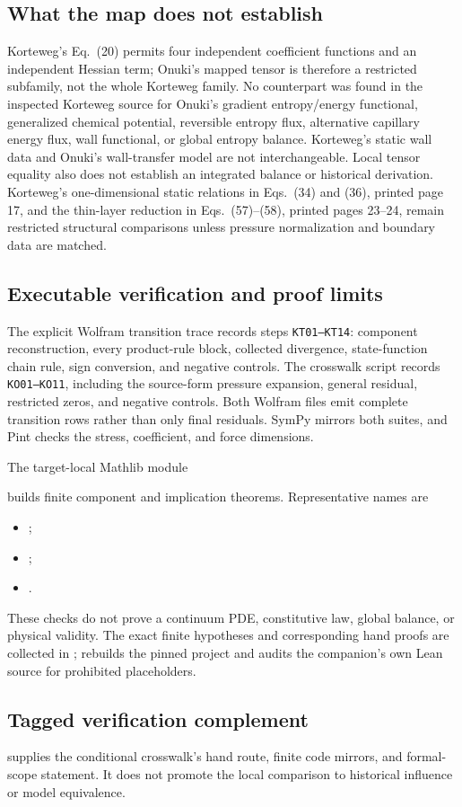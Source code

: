 \subsection*{What the map does not establish}

Korteweg's Eq.~(20) permits four independent coefficient functions and an
independent Hessian term; Onuki's mapped tensor is therefore a restricted
subfamily, not the whole Korteweg family.  No counterpart was found in the
inspected Korteweg source for Onuki's gradient entropy/energy functional,
generalized chemical potential, reversible entropy flux, alternative capillary
energy flux, wall functional, or global entropy balance.  Korteweg's static
wall data and Onuki's wall-transfer model are not interchangeable.  Local
tensor equality also does not establish an integrated balance or historical
derivation.  Korteweg's one-dimensional static relations in Eqs.~(34) and
(36), printed page 17, and the thin-layer reduction in Eqs.~(57)--(58), printed
pages 23--24, remain restricted structural comparisons unless pressure
normalization and boundary data are matched.

\subsection*{Executable verification and proof limits}

The explicit Wolfram transition trace
 records steps
\texttt{KT01--KT14}: component reconstruction, every product-rule block,
collected divergence, state-function chain rule, sign conversion, and negative
controls.  The crosswalk script
 records
\texttt{KO01--KO11}, including the source-form pressure expansion, general
residual, restricted zeros, and negative controls.  Both Wolfram files emit
complete transition rows rather than only final residuals.
SymPy mirrors both suites, and Pint checks the stress, coefficient, and force
dimensions.

The target-local Mathlib module
\begin{quote}
\footnotesize\raggedright
{}
\end{quote}
builds finite component and implication theorems.  Representative names are
\begin{itemize}[leftmargin=2em]
\item {};
\item {};
\item {}.
\end{itemize}
These checks do not prove a continuum PDE, constitutive law, global balance, or
physical validity.  The exact finite hypotheses and corresponding hand proofs
are collected in ;
 rebuilds the pinned project and audits
the companion's own Lean source for prohibited placeholders.

\subsection*{Tagged verification complement}

 supplies the conditional
crosswalk's hand route, finite code mirrors, and formal-scope statement. It does
not promote the local comparison to historical influence or model equivalence.
